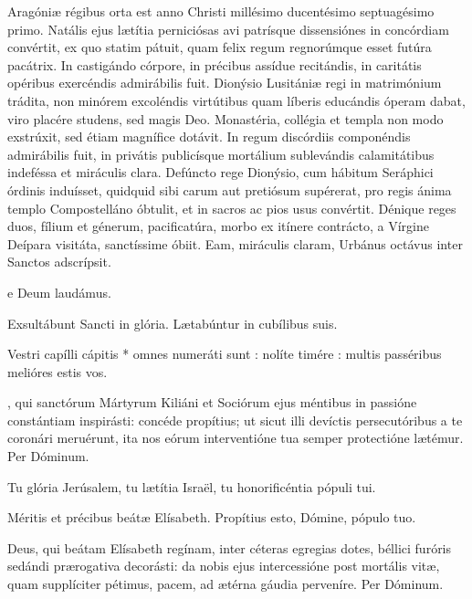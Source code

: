 \documentclass[fontsize=9pt,paper=A6,twoside,BCOR=1mm,DIV=22,headinclude]{scrarticle}
\renewcommand\A{\Ant}
\begin{document}
\begin{multicols}{2}
 Aragóniæ régibus orta est anno Christi millésimo ducentésimo septuagésimo primo. Natális ejus lætítia perniciósas avi patrísque dissensiónes in concórdiam convértit, ex quo statim pátuit, quam felix regum regnorúmque esset futúra pacátrix. In castigándo córpore, in précibus assídue recitándis, in caritátis opéribus exercéndis admirábilis fuit. Dionýsio Lusitániæ regi in matrimónium trádita, non minórem excoléndis virtútibus quam líberis educándis óperam dabat, viro placére studens, sed magis Deo. Monastéria, collégia et templa non modo exstrúxit, sed étiam magnífice dotávit. In regum discórdiis componéndis admirábilis fuit, in privátis publicísque mortálium sublevándis calamitátibus indeféssa et miráculis clara. Defúncto rege Dionýsio, cum hábitum Seráphici órdinis induísset, quidquid sibi carum aut pretiósum supérerat, pro regis ánima templo Compostelláno óbtulit, et in sacros ac pios usus convértit. Dénique reges duos, fílium et génerum, pacificatúra, morbo ex itínere contrácto, a Vírgine Deípara visitáta, sanctíssime óbiit. Eam, miráculis claram, Urbánus octávus inter Sanctos adscrípsit.

e Deum laudámus.


\V Exsultábunt Sancti in glória.
\R Lætabúntur in cubílibus suis.

 Vestri capílli cápitis * omnes numeráti sunt : nolíte timére : multis passéribus melióres estis vos.

, qui sanctórum Mártyrum Kiliáni et Sociórum ejus méntibus in passióne constántiam inspirásti: concéde propítius; ut sicut illi devíctis persecutóribus a te coronári meruérunt, ita nos eórum interventióne tua semper protectióne lætémur. Per Dóminum.


\A Tu glória Jerúsalem, tu lætítia Isra\"el, tu honorificéntia pópuli tui.

\V Méritis et précibus beátæ Elísabeth.
\R Propítius esto, Dómine, pópulo tuo.

{}

 Deus, qui beátam Elísabeth regínam, inter céteras egregias dotes, béllici furóris sedándi prærogativa decorásti: da nobis ejus intercessióne post mortális vitæ, quam supplíciter pétimus, pacem, ad ætérna gáudia perveníre. Per Dóminum.



\end{multicols}
\end{document}
